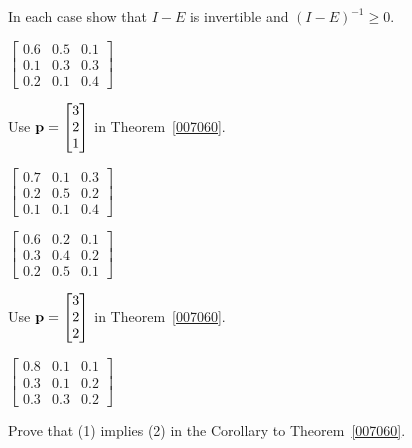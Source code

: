 \documentclass{ximera}
\begin{document}
\begin{problem}
In each case show that $I - E$ is invertible and $(I - E)^{-1} \geq 0$.
\begin{problem}\label{prob:i/o_14}
$\begin{bmatrix}
0.6 & 0.5 & 0.1 \\
0.1 & 0.3 & 0.3 \\
0.2 & 0.1 & 0.4
\end{bmatrix}$
\begin{hint}
Use ${\bf p} = \begin{bmatrix}
3 \\
2 \\
1
\end{bmatrix}$
 in Theorem~\ref{007060}.
\end{hint}
\end{problem}
\begin{problem}\label{prob:i/o_15}
$\begin{bmatrix}
0.7 & 0.1 & 0.3 \\
0.2 & 0.5 & 0.2 \\
0.1 & 0.1 & 0.4
\end{bmatrix}$
\end{problem}
\begin{problem}\label{prob:i/o_16}
$\begin{bmatrix}
0.6 & 0.2 & 0.1 \\
0.3 & 0.4 & 0.2 \\
0.2 & 0.5 & 0.1
\end{bmatrix}$
\begin{hint}
Use ${\bf p} = \begin{bmatrix}
3 \\
2 \\
2
\end{bmatrix}$
 in Theorem~\ref{007060}.
\end{hint}
\end{problem}
\begin{problem}\label{prob:i/o_17}
$\begin{bmatrix}
0.8 & 0.1 & 0.1 \\
0.3 & 0.1 & 0.2 \\
0.3 & 0.3 & 0.2
\end{bmatrix}$
\end{problem}

\end{problem}

\begin{problem}\label{ex:ex2_8_10}
Prove that (1) implies (2) in the Corollary to Theorem~\ref{007060}.
\end{problem}
\end{document}
